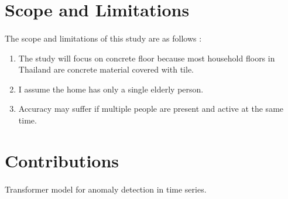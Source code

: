 \section{Scope and Limitations}
\paragraph{}
The scope and limitations of this study are as follows :
\begin{enumerate}
\item The study will focus on concrete floor because most household floors in Thailand are concrete material covered with tile.
\item I assume the home has only a single elderly person.
\item Accuracy may suffer if multiple people are present and active at the same time.
\end{enumerate} 

\section{Contributions}
\paragraph{}
Transformer model for anomaly detection in time series.
